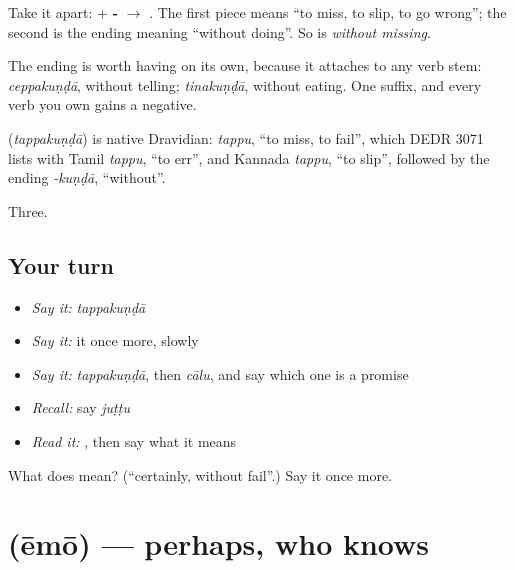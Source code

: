 Take it apart: \textbf{} + \textbf{-} $\to$ \textbf{}. The first piece means \textquotedblleft{}to miss, to slip, to go wrong\textquotedblright{}; the second is the ending meaning \textquotedblleft{}without doing\textquotedblright{}. So  is \emph{without missing}.

The ending is worth having on its own, because it attaches to any verb stem: \emph{ceppakuṇḍā}, without telling; \emph{tinakuṇḍā}, without eating. One suffix, and every verb you own gains a negative.

\begin{cousinweb}
\textbf{} (\emph{tappakuṇḍā}) is native Dravidian: \emph{tappu}, \textquotedblleft{}to miss, to fail\textquotedblright{}, which DEDR 3071 lists with Tamil \emph{tappu}, \textquotedblleft{}to err\textquotedblright{}, and Kannada \emph{tappu}, \textquotedblleft{}to slip\textquotedblright{}, followed by the ending \emph{-kuṇḍā}, \textquotedblleft{}without\textquotedblright{}.
\end{cousinweb}

\begin{grammarlens}[title={What you've built}]
Three.
\end{grammarlens}

\subsection*{Your turn}
\begin{itemize}
\raggedright
  \item \emph{Say it:} \emph{tappakuṇḍā}
  \item \emph{Say it:} it once more, slowly
  \item \emph{Say it:} \emph{tappakuṇḍā}, then \emph{cālu}, and say which one is a promise
  \item \emph{Recall:} say \emph{juṭṭu}
  \item \emph{Read it:} \textbf{}, then say what it means
\end{itemize}

\begin{tcolorbox}[breakable,colback=teal!4,colframe=teal!35!black,title={Before you move on}]
What does  mean? (\textquotedblleft{}certainly, without fail\textquotedblright{}.) Say it once more.
\end{tcolorbox}
\section[\texorpdfstring{\te{ఏమో} (ēmō)}{ఏమో (ēmō)}]{ (ēmō) — perhaps, who knows}

